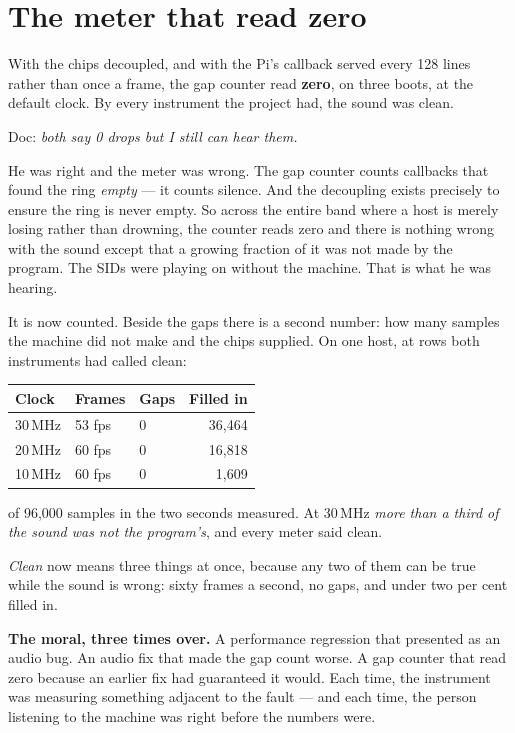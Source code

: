\section{The meter that read zero}
With the chips decoupled, and with the Pi's callback served every 128
lines rather than once a frame, the gap counter read \textbf{zero}, on
three boots, at the default clock. By every instrument the project had,
the sound was clean.

Doc: \emph{both say 0 drops but I still can hear them.}

He was right and the meter was wrong. The gap counter counts callbacks
that found the ring \emph{empty} --- it counts silence. And the
decoupling exists precisely to ensure the ring is never empty. So across
the entire band where a host is merely losing rather than drowning, the
counter reads zero and there is nothing wrong with the sound except that
a growing fraction of it was not made by the program. The SIDs were
playing on without the machine. That is what he was hearing.

It is now counted. Beside the gaps there is a second number: how many
samples the machine did not make and the chips supplied. On one host,
at rows both instruments had called clean:

\begin{center}
\small
\begin{tabular}{@{}l l l r@{}}
\toprule
\textbf{Clock} & \textbf{Frames} & \textbf{Gaps} & \textbf{Filled in} \\
\midrule
30\,MHz & 53 fps & 0 & 36{,}464 \\
20\,MHz & 60 fps & 0 & 16{,}818 \\
10\,MHz & 60 fps & 0 & 1{,}609 \\
\bottomrule
\end{tabular}
\end{center}

\noindent of 96{,}000 samples in the two seconds measured. At 30\,MHz
\emph{more than a third of the sound was not the program's}, and every
meter said clean.

\emph{Clean} now means three things at once, because any two of them can
be true while the sound is wrong: sixty frames a second, no gaps, and
under two per cent filled in.

\begin{aside}
\textbf{The moral, three times over.} A performance regression that
presented as an audio bug. An audio fix that made the gap count worse. A
gap counter that read zero because an earlier fix had guaranteed it
would. Each time, the instrument was measuring something adjacent to the
fault --- and each time, the person listening to the machine was right
before the numbers were.
\end{aside}


